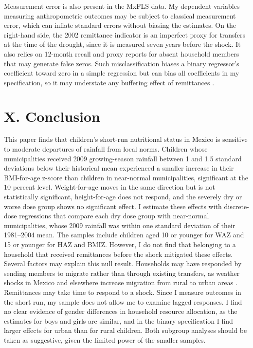 Measurement error is also present in the MxFLS data. My dependent variables measuring anthropometric outcomes may be subject to classical measurement error, which can inflate standard errors without biasing the estimates. On the right-hand side, the 2002 remittance indicator is an imperfect proxy for transfers at the time of the drought, since it is measured seven years before the shock. It also relies on 12-month recall and proxy reports for absent household members that may generate false zeros. Such misclassification biases a binary regressor's coefficient toward zero in a simple regression but can bias all coefficients in my specification, so it may understate any buffering effect of remittances \parencite{aignerRegressionBinaryIndependent1973}.

\section*{X. Conclusion}\label{sec:X}

This paper finds that children's short-run nutritional status in Mexico is sensitive to moderate departures of rainfall from local norms. Children whose municipalities received 2009 growing-season rainfall between 1 and 1.5 standard deviations below their historical mean experienced a smaller increase in their BMI-for-age z-score than children in near-normal municipalities, significant at the 10 percent level. Weight-for-age moves in the same direction but is not statistically significant, height-for-age does not respond, and the severely dry or worse dose group shows no significant effect. I estimate these effects with discrete-dose regressions that compare each dry dose group with near-normal municipalities, whose 2009 rainfall was within one standard deviation of their 1981--2004 mean. The samples include children aged 10 or younger for WAZ and 15 or younger for HAZ and BMIZ. However, I do not find that belonging to a household that received remittances before the shock mitigated these effects. Several factors may explain this null result. Households may have responded by sending members to migrate rather than through existing transfers, as weather shocks in Mexico and elsewhere increase migration from rural to urban areas \parencite{jessoeClimateChangeLabour2018,grogerInternalLaborMigration2016}. Remittances may take time to respond to a shock. Since I measure outcomes in the short run, my sample does not allow me to examine lagged responses. I find no clear evidence of gender differences in household resource allocation, as the estimates for boys and girls are similar, and in the binary specification I find larger effects for urban than for rural children. Both subgroup analyses should be taken as suggestive, given the limited power of the smaller samples.


